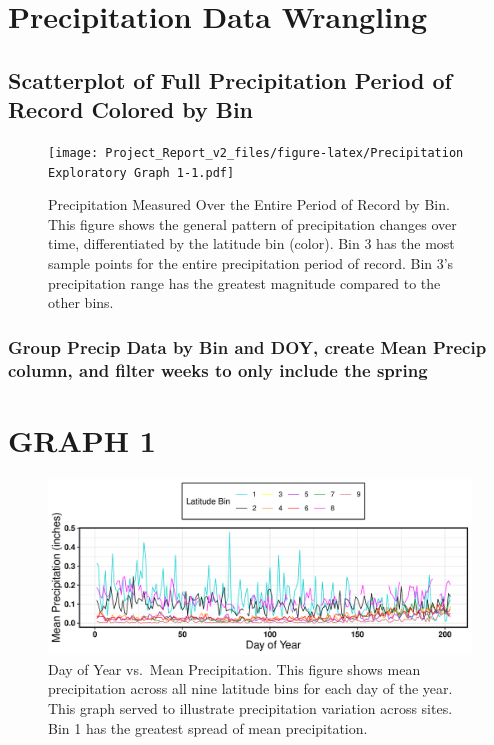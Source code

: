 \documentclass[12pt,]{article}
\begin{document}
\hypertarget{precipitation-data-wrangling}{%
\section{Precipitation Data
Wrangling}\label{precipitation-data-wrangling}}

\hypertarget{scatterplot-of-full-precipitation-period-of-record-colored-by-bin}{%
\subsection{Scatterplot of Full Precipitation Period of Record Colored
by
Bin}\label{scatterplot-of-full-precipitation-period-of-record-colored-by-bin}}

\begin{figure}
\centering
\texttt{[image: Project\_Report\_v2\_files/figure-latex/Precipitation Exploratory Graph 1-1.pdf]}
\caption{Precipitation Measured Over the Entire Period of Record by Bin.
This figure shows the general pattern of precipitation changes over
time, differentiated by the latitude bin (color). Bin 3 has the most
sample points for the entire precipitation period of record. Bin 3's
precipitation range has the greatest magnitude compared to the other
bins.}
\end{figure}

\hypertarget{group-precip-data-by-bin-and-doy-create-mean-precip-column-and-filter-weeks-to-only-include-the-spring}{%
\subsubsection{Group Precip Data by Bin and DOY, create Mean Precip
column, and filter weeks to only include the
spring}\label{group-precip-data-by-bin-and-doy-create-mean-precip-column-and-filter-weeks-to-only-include-the-spring}}

\hypertarget{graph-1}{%
\section{GRAPH 1}\label{graph-1}}

\begin{figure}
\centering
\includegraphics{Project_Report_v2_files/figure-latex/unnamed-chunk-2-1.pdf}
\caption{Day of Year vs.~Mean Precipitation. This figure shows mean
precipitation across all nine latitude bins for each day of the year.
This graph served to illustrate precipitation variation across sites.
Bin 1 has the greatest spread of mean precipitation.}
\end{figure}
\end{document}
